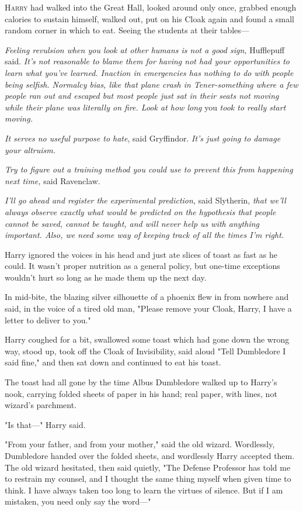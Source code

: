 
\lettrine{H}{arry} had walked
into the Great Hall, looked around only once, grabbed enough calories to
sustain himself, walked out, put on his Cloak again and found a small random
corner in which to eat. Seeing the students at their tables—

\emph{Feeling revulsion when you look at other humans is not a good sign,}
Hufflepuff said. \emph{It's not reasonable to blame them for having not had
your opportunities to learn what you've learned. Inaction in emergencies has
nothing to do with people being selfish. Normalcy bias, like that plane crash
in Tener-something where a few people ran out and escaped but most people just
sat in their seats not moving while their plane was literally on fire. Look at
how long} you \emph{took to really start moving.}

\emph{It serves no useful purpose to hate}, said Gryffindor. \emph{It's just
going to damage your altruism.}

\emph{Try to figure out a training method you could use to prevent this from
happening next time,} said Ravenclaw.

\emph{I'll go ahead and register the experimental prediction,} said Slytherin,
\emph{that we'll always observe exactly what would be predicted on the
hypothesis that people cannot be saved, cannot be taught, and will never help
us with anything important. Also, we need some way of keeping track of all the
times I'm right.}

Harry ignored the voices in his head and just ate slices of toast as fast as he
could. It wasn't proper nutrition as a general policy, but one-time exceptions
wouldn't hurt so long as he made them up the next day.

In mid-bite, the blazing silver silhouette of a phoenix flew in from nowhere
and said, in the voice of a tired old man, "Please remove your Cloak, Harry, I
have a letter to deliver to you."

Harry coughed for a bit, swallowed some toast which had gone down the wrong
way, stood up, took off the Cloak of Invisibility, said aloud "Tell Dumbledore
I said fine," and then sat down and continued to eat his toast.

The toast had all gone by the time Albus Dumbledore walked up to Harry's nook,
carrying folded sheets of paper in his hand; real paper, with lines, not
wizard's parchment.

"Is that—" Harry said.

"From your father, and from your mother," said the old wizard. Wordlessly,
Dumbledore handed over the folded sheets, and wordlessly Harry accepted them.
The old wizard hesitated, then said quietly, "The Defense Professor has told me
to restrain my counsel, and I thought the same thing myself when given time to
think. I have always taken too long to learn the virtues of silence. But if I
am mistaken, you need only say the word—"

